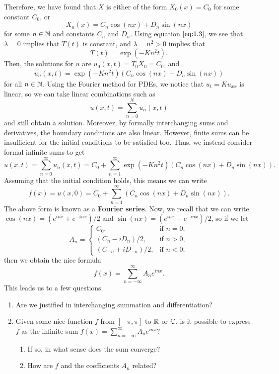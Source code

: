 Therefore, we have found that $X$ is either of the form $X_0(x) = C_0$
for some constant $C_0$, or 
\[ X_n(x) = C_n\cos(nx) + D_n\sin(nx) \] 
for some $n \in \mathbb{N}$ and constants $C_n$ and $D_n$. Using equation 
$\eqref{eq:1.3}$, we see that $\lambda = 0$ implies that $T(t)$ is constant, 
and $\lambda = n^2 > 0$ implies that 
\[ T(t) = \exp(-Kn^2t). \] 
Then, the solutions for $u$ are $u_0(x, t) = T_0 X_0 = C_0$, and 
\[ u_n(x, t) = \exp(-Kn^2t) (C_n\cos(nx) + D_n\sin(nx)) \]
for all $n \in \mathbb{N}$. Using the Fourier method for PDEs, we notice that 
$u_t = Ku_{xx}$ is linear, so we can take linear combinations such as 
\[ u(x, t) = \sum_{n=0}^N u_n(x, t) \] 
and still obtain a solution. Moreover, by formally interchanging 
sums and derivatives, the boundary conditions are also linear.
However, finite sums can be insufficient for the initial conditions to be 
satisfied too. Thus, we instead consider formal infinite sums to get 
\[ u(x, t) = \sum_{n=0}^\infty u_n(x, t) = C_0 + \sum_{n=1}^\infty 
\exp(-Kn^2t) (C_n\cos(nx) + D_n\sin(nx)). \] 
Assuming that the initial condition holds, this means we can write 
\[ f(x) = u(x, 0) = C_0 + \sum_{n=1}^\infty (C_n\cos(nx) + D_n\sin(nx)). \] 
The above form is known as a {\bf Fourier series}. Now, we recall that 
we can write $\cos(nx) = (e^{inx} + e^{-inx})/2$ and $\sin(nx) = 
(e^{inx} - e^{-inx})/2$, so if we let 
\[ A_n = \begin{cases} 
    C_0, & \text{if } n = 0, \\ 
    (C_n - iD_n)/2, & \text{if } n > 0, \\ 
    (C_{-n} + iD_{-n})/2, & \text{if } n < 0, 
\end{cases} \] 
then we obtain the nice formula 
\[ f(x) = \sum_{n=-\infty}^{\infty} A_n e^{inx}. \] 
This leads us to a few questions.
\begin{enumerate}
    \item Are we justified in interchanging summation and differentiation?
    \item Given some nice function $f$ from $[-\pi, \pi]$ to 
    $\mathbb{R}$ or $\mathbb{C}$, is it possible to express $f$ as the infinite sum 
    $f(x) = \sum_{n=-\infty}^\infty A_n e^{inx}$?
    \begin{enumerate}
        \item If so, in what sense does the sum converge?
        \item How are $f$ and the coefficients $A_n$ related?
    \end{enumerate}
\end{enumerate}

